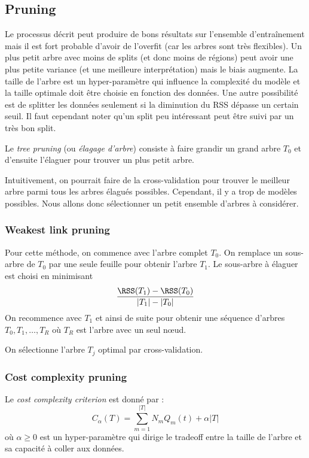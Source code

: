     \subsection{Pruning}
        Le processus décrit peut produire de bons résultats sur l'ensemble d'entraînement mais il est fort probable d'avoir de l'overfit (car les arbres sont très flexibles). Un plus petit arbre avec moins de splits (et donc moins de régions) peut avoir une plus petite variance (et une meilleure interprétation) mais le biais augmente. La taille de l'arbre est un hyper-paramètre qui influence la complexité du modèle et la taille optimale doit être choisie en fonction des données. Une autre possibilité est de splitter les données seulement si la diminution du RSS dépasse un certain seuil. Il faut cependant noter qu'un split peu intéressant peut être suivi par un très bon split.

        \begin{definition}
            Le \textit{tree pruning} (ou \textit{élagage d'arbre}) consiste à faire grandir un grand arbre \(T_0\) et d'ensuite l'élaguer pour trouver un plus petit arbre.
        \end{definition}

        Intuitivement, on pourrait faire de la cross-validation pour trouver le meilleur arbre parmi tous les arbres élagués possibles. Cependant, il y a trop de modèles possibles. Nous allons donc sélectionner un petit ensemble d'arbres à considérer.

        \subsubsection{Weakest link pruning}
            Pour cette méthode, on commence avec l'arbre complet \(T_0\). On remplace un sous-arbre de \(T_0\) par une seule feuille pour obtenir l'arbre \(T_1\). Le sous-arbre à élaguer est choisi en minimisant 
            \[
                \frac{\RSS(T_1) - \RSS(T_0)}{|T_1| - |T_0|}
            \]
            On recommence avec \(T_1\) et ainsi de suite pour obtenir une séquence d'arbres \(T_0, T_1, \dots, T_R\) où \(T_R\) est l'arbre avec un seul nœud.
            
            On sélectionne l'arbre \(T_j\) optimal par cross-validation.

        \subsubsection{Cost complexity pruning}
            Le \textit{cost complexity criterion} est donné par :
            \[
                C_\alpha(T) = \sum_{m = 1}^{|T|} N_m Q_m(t) + \alpha |T|
            \]
            où \(\alpha \geq 0\) est un hyper-paramètre qui dirige le tradeoff entre la taille de l'arbre et sa capacité à coller aux données.

